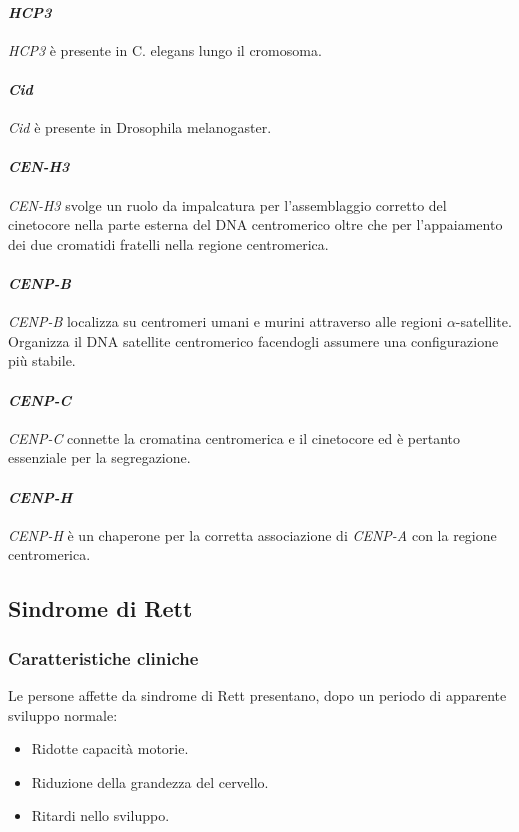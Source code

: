 			\paragraph{\emph{HCP3}}
			\emph{HCP3} \`e presente in C. elegans lungo il cromosoma.

			\paragraph{\emph{Cid}}
			\emph{Cid} \`e presente in Drosophila melanogaster.

			\paragraph{\emph{CEN-H3}}
			\emph{CEN-H3} svolge un ruolo da impalcatura per l'assemblaggio corretto del cinetocore nella parte esterna del DNA centromerico oltre che per l'appaiamento dei due cromatidi fratelli nella regione centromerica.

			\paragraph{\emph{CENP-B}}
			\emph{CENP-B} localizza su centromeri umani e murini attraverso alle regioni $\alpha$-satellite.
			Organizza il DNA satellite centromerico facendogli assumere una configurazione pi\`u stabile.

			\paragraph{\emph{CENP-C}}
			\emph{CENP-C} connette la cromatina centromerica e il cinetocore ed \`e pertanto essenziale per la segregazione.

			\paragraph{\emph{CENP-H}}
			\emph{CENP-H} \`e un chaperone per la corretta associazione di \emph{CENP-A} con la regione centromerica.



		
	\subsection{Sindrome di Rett}
	
		\subsubsection{Caratteristiche cliniche}
		Le persone affette da sindrome di Rett presentano, dopo un periodo di apparente sviluppo normale:
		\begin{multicols}{3}
			\begin{itemize}
				\item Ridotte capacit\`a motorie.
				\item Riduzione della grandezza del cervello.
				\item Ritardi nello sviluppo.
			\end{itemize}
		\end{multicols}

